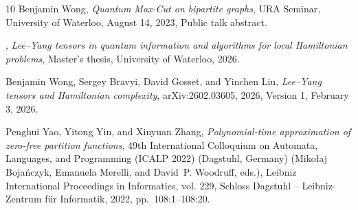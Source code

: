\documentclass[reqno]{amsart}
\theoremstyle{definition}
\theoremstyle{remark}
\begin{document}
\begin{thebibliography}{10}
Benjamin Wong, \emph{Quantum {Max-Cut} on bipartite graphs}, URA Seminar,
  University of Waterloo, August 14, 2023, Public talk abstract.

\bysame, \emph{{Lee--Yang} tensors in quantum information and algorithms for
  local {Hamiltonian} problems}, Master's thesis, University of Waterloo, 2026.

Benjamin Wong, Sergey Bravyi, David Gosset, and Yinchen Liu, \emph{{Lee--Yang}
  tensors and {Hamiltonian} complexity}, arXiv:2602.03605, 2026, Version 1,
  February 3, 2026.

Penghui Yao, Yitong Yin, and Xinyuan Zhang, \emph{Polynomial-time approximation
  of zero-free partition functions}, 49th International Colloquium on Automata,
  Languages, and Programming ({ICALP} 2022) (Dagstuhl, Germany) (Miko{\l}aj
  Boja\'{n}czyk, Emanuela Merelli, and David~P. Woodruff, eds.), Leibniz
  International Proceedings in Informatics, vol. 229, Schloss Dagstuhl --
  Leibniz-Zentrum f{\"u}r Informatik, 2022, pp.~108:1--108:20.

\end{thebibliography}
\end{document}
